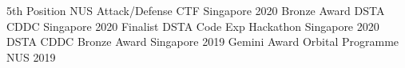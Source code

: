 



\begin{cvhonors}
  \cvhonor
  {5th Position} %
  {NUS Attack/Defense CTF} %
  {Singapore} %
  {2020} %
  \cvhonor
  {Bronze Award} %
  {DSTA CDDC} %
  {Singapore} %
  {2020} %
  \cvhonor
  {Finalist} %
  {DSTA Code Exp Hackathon} %
  {Singapore} %
  {2020} %
  \cvhonor
  {DSTA CDDC} %
  {Bronze Award} %
  {Singapore} %
  {2019} %
  \cvhonor
  {Gemini Award} %
  {Orbital Programme} %
  {NUS} %
  {2019} %




\end{cvhonors}
